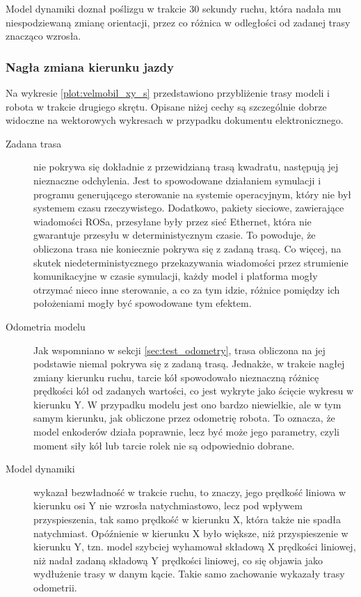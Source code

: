 		Model dynamiki doznał poślizgu w trakcie 30 sekundy ruchu, która nadała mu niespodziewaną zmianę orientacji, przez co różnica w odległości od zadanej trasy znacząco wzrosła.
		
		\subsubsection{Nagła zmiana kierunku jazdy}
			Na wykresie \ref{plot:velmobil_xy_s} przedstawiono przybliżenie trasy modeli i robota w trakcie drugiego skrętu.
			Opisane niżej cechy są szczególnie dobrze widoczne na wektorowych wykresach w przypadku dokumentu elektronicznego.
			\begin{description}
				\item[Zadana trasa] nie pokrywa się dokładnie z przewidzianą trasą kwadratu, następują jej nieznaczne odchylenia.
				Jest to spowodowane działaniem symulacji i programu generującego sterowanie na systemie operacyjnym, który nie był systemem czasu rzeczywistego.
				Dodatkowo, pakiety sieciowe, zawierające wiadomości ROSa, przesyłane były przez sieć Ethernet, która nie gwarantuje przesyłu w deterministycznym czasie.
				To powoduje, że obliczona trasa nie koniecznie pokrywa się z zadaną trasą. Co więcej, na skutek niedeterministycznego przekazywania wiadomości przez strumienie komunikacyjne w czasie symulacji, każdy model i platforma mogły otrzymać nieco inne sterowanie, a co za tym idzie, różnice pomiędzy ich położeniami mogły być spowodowane tym efektem.
				\item[Odometria modelu] Jak wspomniano w sekcji \ref{sec:test_odometry}, trasa obliczona na jej podstawie niemal pokrywa się z zadaną trasą. 
				Jednakże, w trakcie nagłej zmiany kierunku ruchu, tarcie kół spowodowało nieznaczną różnicę prędkości kół od zadanych wartości, co jest 
				wykryte jako ścięcie wykresu w kierunku Y. W przypadku modelu jest ono bardzo niewielkie, ale w tym samym kierunku, jak obliczone przez odometrię robota.
				To oznacza, że model enkoderów działa poprawnie, lecz być może jego parametry, czyli moment siły kół lub tarcie rolek nie są odpowiednio dobrane.
				\item[Model dynamiki] wykazał bezwładność w trakcie ruchu, to znaczy, jego prędkość liniowa w kierunku osi Y nie wzrosła natychmiastowo,
				lecz pod wpływem przyspieszenia, tak samo prędkość w kierunku X, która także nie spadła natychmiast.
				Opóźnienie w kierunku X było większe, niż przyspieszenie w kierunku Y, tzn. model szybciej wyhamował składową X prędkości liniowej, niż nadał zadaną składową Y prędkości liniowej, co się objawia jako wydłużenie trasy w danym kącie. Takie samo zachowanie wykazały trasy odometrii.

\end{description}
